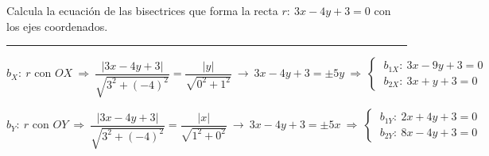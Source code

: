 \begin{miejercicio}

Calcula la ecuación de las bisectrices que forma la recta $r:\ 3x-4y+3=0$ con los ejes coordenados.

\rule{250pt}{0.1pt}

\vspace{2mm}$b_X:\ r \text{ con } OX \ \Rightarrow \ \dfrac{|3x-4y+3|}{\sqrt{3^2+(-4)^2}}=\dfrac{|y|}{\sqrt{0^2+1^2}} \ \to \ 3x-4y+3=\pm 5y \ \Rightarrow \ \begin{cases} \ b_{1X}:\ 3x-9y+3=0 \\ \ b_{2X}:\ 3x+y+3=0 \end{cases}$	

\vspace{5mm}$b_Y:\ r \text{ con } OY \ \Rightarrow \ \dfrac{|3x-4y+3|}{\sqrt{3^2+(-4)^2}}=\dfrac{|x|}{\sqrt{1^2+0^2}} \ \to \ 3x-4y+3=\pm 5x \ \Rightarrow \ \begin{cases} \ b_{1Y}:\ 2x+4y+3=0 \\ \ b_{2Y}:\ 8x-4y+3=0 \end{cases}$
\end{miejercicio}


